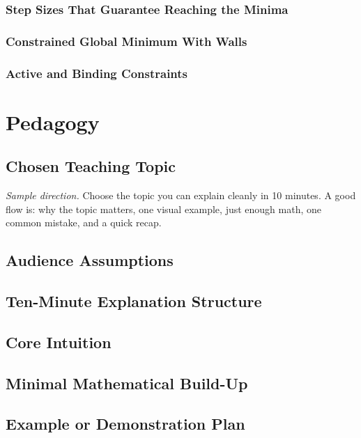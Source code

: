 \documentclass[11pt,a4paper]{article}
\newcommand{\answergap}{\vspace{0.9em}}
\newcommand{\sample}[1]{%
  \vspace{0.2em}
  \noindent\textit{Sample direction.} #1\par
  \vspace{0.45em}
}
\begin{document}
\subsubsection{Step Sizes That Guarantee Reaching the Minima}
\answergap

\subsubsection{Constrained Global Minimum With Walls}
\answergap

\subsubsection{Active and Binding Constraints}
\answergap

\section{Pedagogy}

\subsection{Chosen Teaching Topic}
\sample{Choose the topic you can explain cleanly in 10 minutes. A good flow is: why the topic matters, one visual example, just enough math, one common mistake, and a quick recap.}

\subsection{Audience Assumptions}
\answergap

\subsection{Ten-Minute Explanation Structure}
\answergap

\subsection{Core Intuition}
\answergap

\subsection{Minimal Mathematical Build-Up}
\answergap

\subsection{Example or Demonstration Plan}
\answergap
\end{document}
